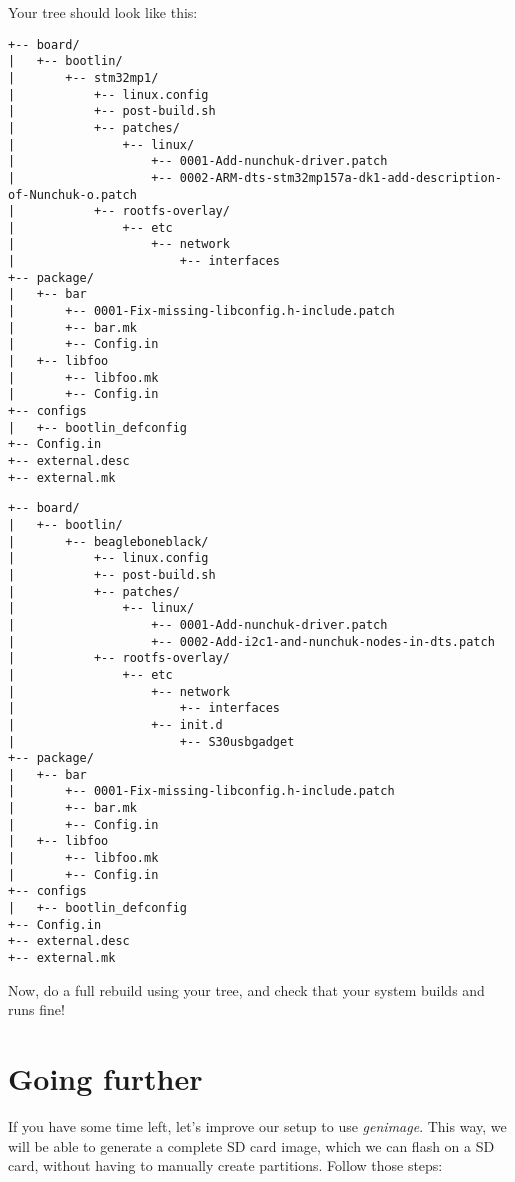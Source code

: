 Your  tree should look like this:

\if{}
\begin{verbatim}
+-- board/
|   +-- bootlin/
|       +-- stm32mp1/
|           +-- linux.config
|           +-- post-build.sh
|           +-- patches/
|               +-- linux/
|                   +-- 0001-Add-nunchuk-driver.patch
|                   +-- 0002-ARM-dts-stm32mp157a-dk1-add-description-of-Nunchuk-o.patch
|           +-- rootfs-overlay/
|               +-- etc
|                   +-- network
|                       +-- interfaces
+-- package/
|   +-- bar
|       +-- 0001-Fix-missing-libconfig.h-include.patch
|       +-- bar.mk
|       +-- Config.in
|   +-- libfoo
|       +-- libfoo.mk
|       +-- Config.in
+-- configs
|   +-- bootlin_defconfig
+-- Config.in
+-- external.desc
+-- external.mk
\end{verbatim}
\else
\begin{verbatim}
+-- board/
|   +-- bootlin/
|       +-- beagleboneblack/
|           +-- linux.config
|           +-- post-build.sh
|           +-- patches/
|               +-- linux/
|                   +-- 0001-Add-nunchuk-driver.patch
|                   +-- 0002-Add-i2c1-and-nunchuk-nodes-in-dts.patch
|           +-- rootfs-overlay/
|               +-- etc
|                   +-- network
|                       +-- interfaces
|                   +-- init.d
|                       +-- S30usbgadget
+-- package/
|   +-- bar
|       +-- 0001-Fix-missing-libconfig.h-include.patch
|       +-- bar.mk
|       +-- Config.in
|   +-- libfoo
|       +-- libfoo.mk
|       +-- Config.in
+-- configs
|   +-- bootlin_defconfig
+-- Config.in
+-- external.desc
+-- external.mk
\end{verbatim}
\fi

Now, do a full rebuild using your  tree, and check
that your system builds and runs fine!

\section{Going further}

If you have some time left, let's improve our setup to use {\em
  genimage}. This way, we will be able to generate a complete SD card
image, which we can flash on a SD card, without having to manually
create partitions. Follow those steps:

